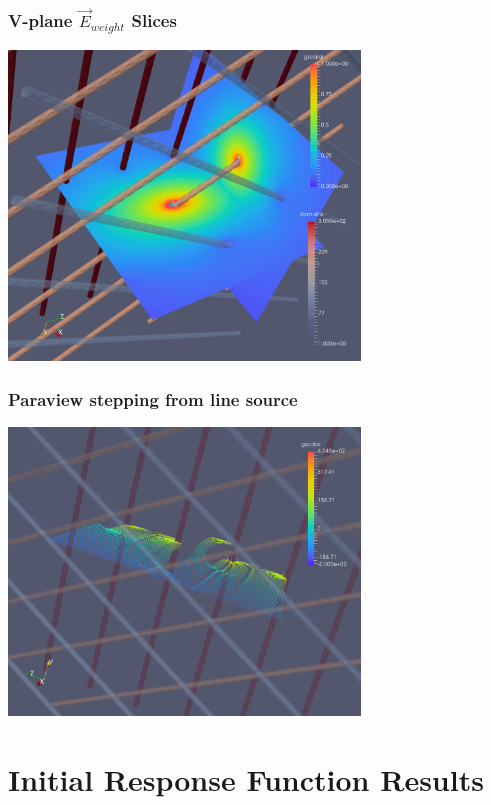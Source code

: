 \documentclass[xcolor=dvipsnames]{beamer}
\begin{document}
\begin{frame}
  \frametitle{V-plane $\vec{E}_{weight}$ Slices}
  \begin{center}
      \includegraphics[width=0.7\textwidth]{cap-vweight-field-fine-slices.png}
  \end{center}
\end{frame}

\begin{frame}
  \frametitle{Paraview stepping from line source}
  \begin{center}
      \includegraphics[width=0.7\textwidth]{track-drift-2.png}
  \end{center}
\end{frame}

\section{Initial Response Function Results}
\end{document}
